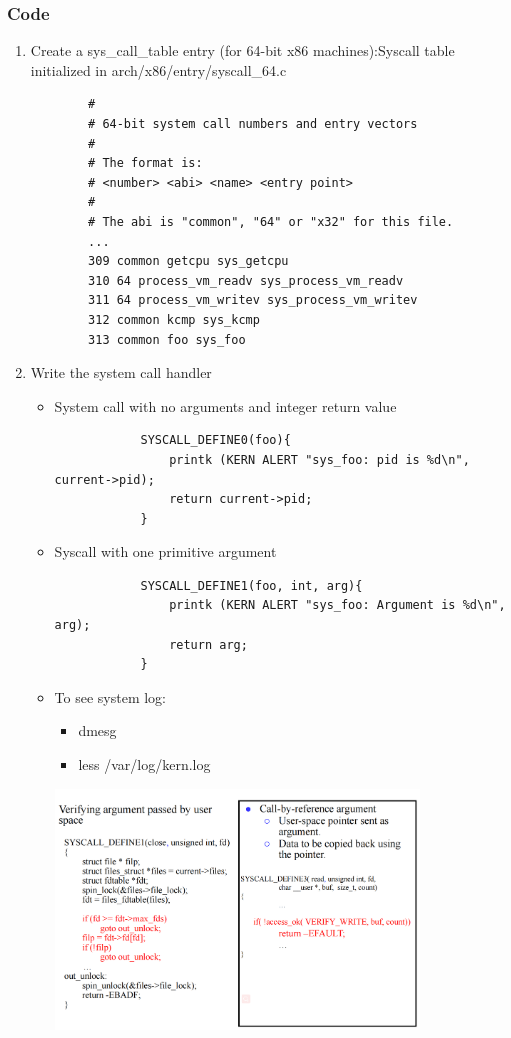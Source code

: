 \documentclass[12pt]{article}
\begin{document}
\subsubsection{Code}
\begin{enumerate}
    \item Create a sys\_call\_table entry (for 64-bit x86 machines):Syscall table initialized in arch/x86/entry/syscall\_64.c \begin{lstlisting}
        # 
        # 64-bit system call numbers and entry vectors 
        # 
        # The format is: 
        # <number> <abi> <name> <entry point> 
        # 
        # The abi is "common", "64" or "x32" for this file. 
        ... 
        309 common getcpu sys_getcpu 
        310 64 process_vm_readv sys_process_vm_readv 
        311 64 process_vm_writev sys_process_vm_writev 
        312 common kcmp sys_kcmp 
        313 common foo sys_foo
    \end{lstlisting}
    \item Write the system call handler \begin{itemize}
        \item System call with no arguments and integer return value \begin{lstlisting}
            SYSCALL_DEFINE0(foo){ 
                printk (KERN ALERT "sys_foo: pid is %d\n", current->pid); 
                return current->pid; 
            }
        \end{lstlisting}
        \item Syscall with one primitive argument \begin{lstlisting}
            SYSCALL_DEFINE1(foo, int, arg){
                printk (KERN ALERT "sys_foo: Argument is %d\n", arg); 
                return arg;
            }
        \end{lstlisting}
        \item To see system log: \begin{itemize}
            \item dmesg
            \item less /var/log/kern.log
        \end{itemize}
        \includegraphics[width=0.8\textwidth]{SystemCallHandler.png}

\end{itemize}
\end{enumerate}
\end{document}
